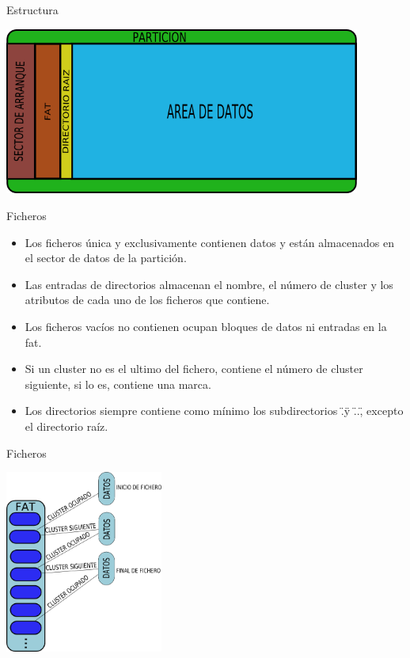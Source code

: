 \begin{frame}{Estructura}
  \begin{center}
    \includegraphics[height=5.5cm]{imgs/fat_struct.png}
  \end{center}
\end{frame}

\begin{frame}{Ficheros}
  \begin{itemize}
    \item Los ficheros única y exclusivamente contienen datos y están almacenados en el sector de datos de la partición.
    \item Las entradas de directorios almacenan el nombre, el número de cluster y los atributos de cada uno de los ficheros que contiene.
    \item Los ficheros vacíos no contienen ocupan bloques de datos ni entradas en la fat.
    \item Si un cluster no es el ultimo del fichero, contiene el número de cluster siguiente, si lo es, contiene una marca.
    \item Los directorios siempre contiene como mínimo los subdirectorios \".\" y \"..\", excepto el directorio raíz.
  \end{itemize}
\end{frame}

\begin{frame}{Ficheros}
  \begin{center}
    \includegraphics[height=6cm]{imgs/fat_files.png}
  \end{center}
\end{frame}
